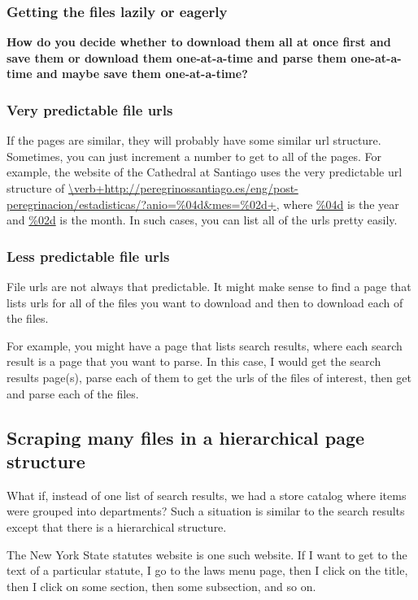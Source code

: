 \documentclass{article}
\newcommand\todo[1]{\textbf{#1}}
\begin{document}
\subsubsection{Getting the files lazily or eagerly}
\todo{How do you decide whether to download them all at once first and save them or download them one-at-a-time and parse them one-at-a-time and maybe save them one-at-a-time?}

\subsubsection{Very predictable file urls}
If the pages are similar, they will probably have some similar url structure.
Sometimes, you can just increment a number to get to all of the pages.
For example, the website of the Cathedral at Santiago uses the very predictable
url structure of
\url{\verb+http://peregrinossantiago.es/eng/post-peregrinacion/estadisticas/?anio=%04d&mes=%02d+},
where \url{\%04d} is the year and \url{\%02d} is the month.
In such cases, you can list all of the urls pretty easily.

\subsubsection{Less predictable file urls}
File urls are not always that predictable. It might make sense to find a page
that lists urls for all of the files you want to download and then to download
each of the files.

For example, you might have a page that lists search results,
where each search result is a page that you want to parse.
In this case, I would get the search results page(s), parse each
of them to get the urls of the files of interest, then get and
parse each of the files.

\subsection{Scraping many files in a hierarchical page structure}
What if, instead of one list of search results, we had a store catalog
where items were grouped into departments? Such a situation is similar
to the search results except that there is a hierarchical structure.

The New York State statutes website is one such website. If I want to
get to the text of a particular statute, I go to the laws menu page,
then I click on the title, then I click on some section, then some
subsection, and so on.
\end{document}
